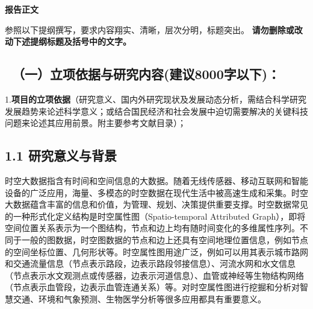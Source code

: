 \documentclass[12pt,UTF8,AutoFakeBold=2,a4paper]{ctexart} %
\newcommand{\sanhao}{\fontsize{16pt}{\baselineskip}\selectfont}
\newcommand{\sihao}{\fontsize{14pt}{\baselineskip}\selectfont}
\begin{document}
\begin{center}
{\sanhao \kaishu \bfseries 报告正文}
\end{center}
{\sihao \kaishu 参照以下提纲撰写，要求内容翔实、清晰，层次分明，标题突出。{\color{MsBlue} \bfseries 请勿删除或改动下述提纲标题及括号中的文字。}}
\vskip -5mm
{\color{MsBlue} \subsection{\sihao \kaishu \quad \ （一）立项依据与研究内容(建议8000字以下)： }}

{\sihao \kaishu \color{MsBlue} 1.{\bfseries 项目的立项依据}（研究意义、国内外研究现状及发展动态分析，需结合科学研究发展趋势来论述科学意义；或结合国民经济和社会发展中迫切需要解决的关键科技问题来论述其应用前景。附主要参考文献目录）；}



\subsection{1.1 研究意义与背景}

%

时空大数据指含有时间和空间信息的大数据。随着无线传感器、移动互联网和智能设备的广泛应用，海量、多模态的时空数据在现代生活中被高速生成和采集。时空大数据蕴含丰富的信息和价值，为管理、规划、决策提供重要支撑。时空数据常见的一种形式化定义结构是时空属性图（Spatio-temporal Attributed Graph），即将空间位置关系表示为一个图结构，节点和边上均有随时间变化的多维属性序列。不同于一般的图数据，时空图数据的节点和边上还具有空间地理位置信息，例如节点的空间坐标位置、几何形状等。时空属性图用途广泛，例如可以用其表示城市路网和交通流量信息（节点表示路段，边表示路段邻接信息）、河流水网和水文信息（节点表示水文观测点或传感器，边表示河道信息）、血管或神经等生物结构网络（节点表示血管段，边表示血管连通关系）等。对时空属性图进行挖掘和分析对智慧交通、环境和气象预测、生物医学分析等很多应用都具有重要意义。
\end{document}
